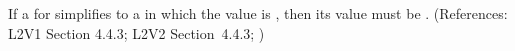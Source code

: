 If a \UnitDefinition for  simplifies to a \Unit in which the
  value is , then its
  value must be .  (References:
L2V1 Section 4.4.3; L2V2 Section~4.4.3; )
